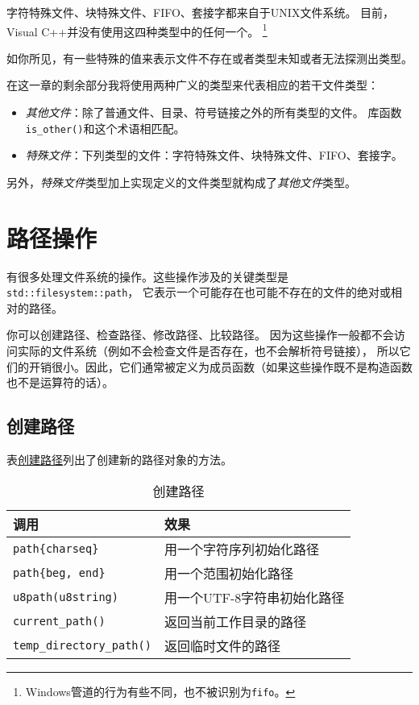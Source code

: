 字符特殊文件、块特殊文件、FIFO、套接字都来自于UNIX文件系统。
目前，Visual C++并没有使用这四种类型中的任何一个。
\footnote{Windows管道的行为有些不同，也不被识别为\texttt{fifo}。}

如你所见，有一些特殊的值来表示文件不存在或者类型未知或者无法探测出类型。

在这一章的剩余部分我将使用两种广义的类型来代表相应的若干文件类型：\label{文件类型}
\begin{itemize}
    \item \emph{其他文件}：除了普通文件、目录、符号链接之外的所有类型的文件。
    库函数\texttt{is\_other()}和这个术语相匹配。
    \item \emph{特殊文件}：下列类型的文件：字符特殊文件、块特殊文件、FIFO、套接字。
\end{itemize}
另外，\emph{特殊文件}类型加上实现定义的文件类型就构成了\emph{其他文件}类型。


\section{路径操作}
有很多处理文件系统的操作。这些操作涉及的关键类型是\texttt{std::filesystem::path}，
它表示一个可能存在也可能不存在的文件的绝对或相对的路径。

你可以创建路径、检查路径、修改路径、比较路径。
因为这些操作一般都不会访问实际的文件系统（例如不会检查文件是否存在，也不会解析符号链接），
所以它们的开销很小。因此，它们通常被定义为成员函数（如果这些操作既不是构造函数也不是运算符的话）。

\subsection{创建路径}
表\hyperref[t20.3]{创建路径}列出了创建新的路径对象的方法。
\begin{table}[htb]
    \centering
    \begin{tabular}{l|l}
        \hline
        \textbf{调用}                      & \textbf{效果}      \\
        \hline
        \texttt{path\{charseq\}}         & 用一个字符序列初始化路径     \\
        \texttt{path\{beg, end\}}        & 用一个范围初始化路径       \\
        \texttt{u8path(u8string)}        & 用一个UTF-8字符串初始化路径 \\
        \texttt{current\_path()}         & 返回当前工作目录的路径      \\
        \texttt{temp\_directory\_path()} & 返回临时文件的路径        \\
        \hline
    \end{tabular}
    \caption{创建路径}
    \label{t20.3}
\end{table}


